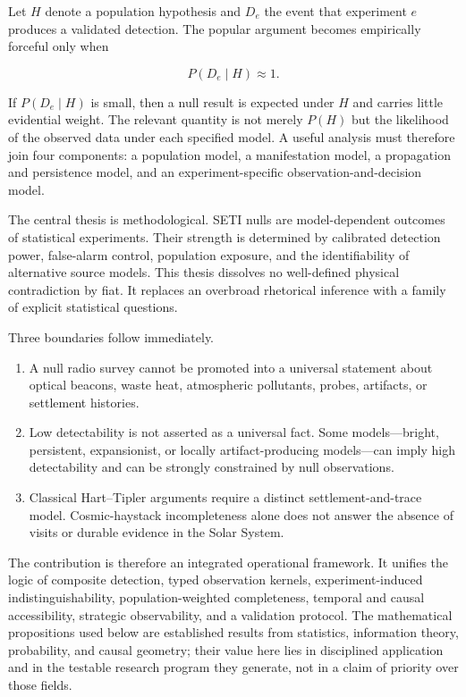 \documentclass[11pt,a4paper]{article}
\begin{document}
Let \(H\) denote a population hypothesis and \(D_e\) the event that experiment \(e\) produces a validated detection. The popular argument becomes empirically forceful only when

\begin{equation}
P(D_e\mid H) \approx 1.
\end{equation}

If \(P(D_e\mid H)\) is small, then a null result is expected under \(H\) and carries little evidential weight. The relevant quantity is not merely \(P(H)\) but the likelihood of the observed data under each specified model. A useful analysis must therefore join four components: a population model, a manifestation model, a propagation and persistence model, and an experiment-specific observation-and-decision model.

The central thesis is methodological. SETI nulls are model-dependent outcomes of statistical experiments. Their strength is determined by calibrated detection power, false-alarm control, population exposure, and the identifiability of alternative source models. This thesis dissolves no well-defined physical contradiction by fiat. It replaces an overbroad rhetorical inference with a family of explicit statistical questions.

Three boundaries follow immediately.


\begin{enumerate}
\def\labelenumi{\arabic{enumi}.}
\item
  A null radio survey cannot be promoted into a universal statement about optical beacons, waste heat, atmospheric pollutants, probes, artifacts, or settlement histories.
\item
  Low detectability is not asserted as a universal fact. Some models---bright, persistent, expansionist, or locally artifact-producing models---can imply high detectability and can be strongly constrained by null observations.
\item
  Classical Hart--Tipler arguments require a distinct settlement-and-trace model. Cosmic-haystack incompleteness alone does not answer the absence of visits or durable evidence in the Solar System.
\end{enumerate}

The contribution is therefore an integrated operational framework. It unifies the logic of composite detection, typed observation kernels, experiment-induced indistinguishability, population-weighted completeness, temporal and causal accessibility, strategic observability, and a validation protocol. The mathematical propositions used below are established results from statistics, information theory, probability, and causal geometry; their value here lies in disciplined application and in the testable research program they generate, not in a claim of priority over those fields.
\end{document}
